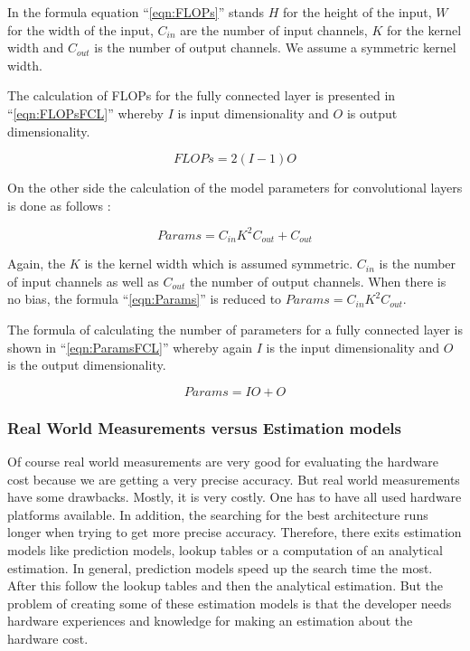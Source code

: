 \documentclass[conference]{IEEEtran}
\begin{document}
In the formula equation ``\eqref{eqn:FLOPs}'' stands $H$ for the height of the input, $W$ for the width of the input, $C_{in}$ are the number of input channels, $K$ for the kernel width and $C_{out}$ is the number of output channels. We assume a symmetric kernel width. 

The calculation of FLOPs for the fully connected layer is presented in ``\eqref{eqn:FLOPsFCL}'' whereby $I$ is input dimensionality and $O$ is output dimensionality. 

\begin{equation}
\label{eqn:FLOPsFCL}
FLOPs = 2(I-1)O
\end{equation} 

On the other side the calculation of the model parameters for convolutional layers is done as follows \cite{bib6}:

\begin{equation}
\label{eqn:Params}
Params = C_{in}K^{2}C_{out}+C_{out}
\end{equation} 

Again, the $K$ is the kernel width which is assumed symmetric. $C_{in}$ is the number of input channels as well as $C_{out}$ the number of output channels. When there is no bias, the formula ``\eqref{eqn:Params}'' is reduced to $Params = C_{in}K^{2}C_{out}$. 

The formula of calculating the number of parameters for a fully connected layer is shown in ``\eqref{eqn:ParamsFCL}'' whereby again $I$ is the input dimensionality and $O$ is the output dimensionality. 

\begin{equation}
\label{eqn:ParamsFCL}
Params = IO+O
\end{equation}  


\subsubsection{Real World Measurements versus Estimation models}

Of course real world measurements are very good for evaluating the hardware cost because we are getting a very precise accuracy. But real world measurements have some drawbacks. Mostly, it is very costly. One has to have all used hardware platforms available. In addition, the searching for the best architecture runs longer when trying to get more precise accuracy. Therefore, there exits estimation models like prediction models, lookup tables or a computation of an analytical estimation. In general, prediction models speed up the search time the most. After this follow the lookup tables and then the analytical estimation. But the problem of creating some of these estimation models is that the developer needs hardware experiences and knowledge for making an estimation about the hardware cost.
\end{document}
